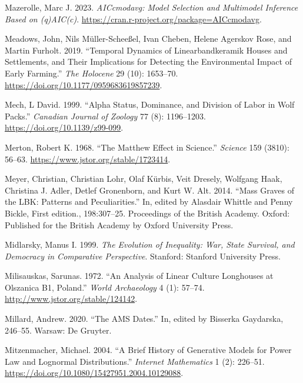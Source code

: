 \documentclass[
  12pt,
  a4paper, twoside]{book}
\newlength{\cslhangindent}
\newlength{\cslentryspacingunit} %
\newenvironment{CSLReferences}[2] %
 {%
  \setlength{\parindent}{0pt}
  \ifodd #1
  \let\oldpar\par
  \def\par{\hangindent=\cslhangindent\oldpar}
  \fi
  \setlength{\parskip}{#2\cslentryspacingunit}
 }%
 {}
\begin{document}
\begin{CSLReferences}{1}{0}
\leavevmode{}%
Mazerolle, Marc J. 2023. \emph{AICcmodavg: Model Selection and Multimodel Inference Based on (q)AIC(c)}. \url{https://cran.r-project.org/package=AICcmodavg}.

\leavevmode{}%
Meadows, John, Nils Müller-Scheeßel, Ivan Cheben, Helene Agerskov Rose, and Martin Furholt. 2019. {``Temporal Dynamics of Linearbandkeramik Houses and Settlements, and Their Implications for Detecting the Environmental Impact of Early Farming.''} \emph{The Holocene} 29 (10): 1653--70. \url{https://doi.org/10.1177/0959683619857239}.

\leavevmode{}%
Mech, L David. 1999. {``Alpha Status, Dominance, and Division of Labor in Wolf Packs.''} \emph{Canadian Journal of Zoology} 77 (8): 1196--1203. \url{https://doi.org/10.1139/z99-099}.

\leavevmode{}%
Merton, Robert K. 1968. {``The Matthew Effect in Science.''} \emph{Science} 159 (3810): 56--63. \url{https://www.jstor.org/stable/1723414}.

\leavevmode{}%
Meyer, Christian, Christian Lohr, Olaf Kürbis, Veit Dresely, Wolfgang Haak, Christina J. Adler, Detlef Gronenborn, and Kurt W. Alt. 2014. {``Mass Graves of the LBK: Patterns and Peculiarities.''} In, edited by Alasdair Whittle and Penny Bickle, First edition., 198:307--25. Proceedings of the British Academy. Oxford: Published for the British Academy by Oxford University Press.

\leavevmode{}%
Midlarsky, Manus I. 1999. \emph{The Evolution of Inequality: War, State Survival, and Democracy in Comparative Perspective}. Stanford: Stanford University Press.

\leavevmode{}%
Milisauskas, Sarunas. 1972. {``An Analysis of Linear Culture Longhouses at Olszanica B1, Poland.''} \emph{World Archaeology} 4 (1): 57--74. \url{http://www.jstor.org/stable/124142}.

\leavevmode{}%
Millard, Andrew. 2020. {``The AMS Dates.''} In, edited by Bisserka Gaydarska, 246--55. Warsaw: De Gruyter.

\leavevmode{}%
Mitzenmacher, Michael. 2004. {``A Brief History of Generative Models for Power Law and Lognormal Distributions.''} \emph{Internet Mathematics} 1 (2): 226--51. \url{https://doi.org/10.1080/15427951.2004.10129088}.


\end{CSLReferences}
\end{document}
